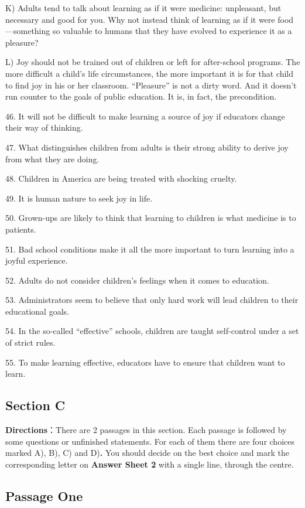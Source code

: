\documentclass[UTF8,11pt]{ctexart}
\begin{document}
K) Adults tend to talk about learning as if it were medicine: unpleasant, but necessary and good for you. Why not instead think of learning as if it were food—something so valuable to humans that they have evolved to experience it as a pleasure?


L) Joy should not be trained out of children or left for after-school programs. The more difficult a child’s life circumstances, the more important it is for that child to find joy in his or her classroom. “Pleasure” is not a dirty word. And it doesn’t run counter to the goals of public education. It is, in fact, the precondition.


46. It will not be difficult to make learning a source of joy if educators change their way of thinking.


47. What distinguishes children from adults is their strong ability to derive joy from what they are doing.


48. Children in America are being treated with shocking cruelty.


49. It is human nature to seek joy in life.


50. Grown-ups are likely to think that learning to children is what medicine is to patients.


51. Bad school conditions make it all the more important to turn learning into a joyful experience.


52. Adults do not consider children’s feelings when it comes to education.


53. Administrators seem to believe that only hard work will lead children to their educational goals.


54. In the so-called “effective” schools, children are taught self-control under a set of strict rules.


55. To make learning effective, educators have to ensure that children want to learn.


\subsection*{\textbf{Section C}}


\textbf{Directions}：There are 2 passages in this section. Each passage is followed by some questions or unfinished statements. For each of them there are four choices marked A), B), C) and D)\textbf{.} You should decide on the best choice and mark the corresponding letter on\textbf{ Answer Sheet 2} with a single line, through the centre.


\subsection*{Passage One}
\end{document}

